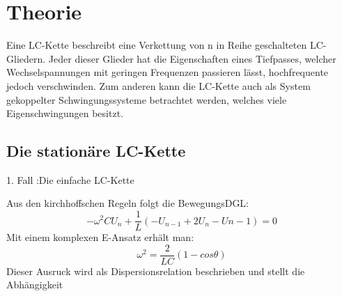 
\section{Theorie}
\label{sec:Theorie}

Eine LC-Kette beschreibt eine Verkettung von n in Reihe geschalteten LC-Gliedern. Jeder dieser Glieder hat die
 Eigenschaften eines Tiefpasses, welcher Wechselspannungen mit geringen Frequenzen passieren lässt, hochfrequente jedoch verschwinden. Zum anderen kann die LC-Kette auch als System gekoppelter Schwingungssysteme betrachtet werden, welches viele Eigenschwingungen besitzt.


\subsection{Die stationäre LC-Kette}
1. Fall :Die einfache LC-Kette

Aus den kirchhoffschen Regeln folgt die BewegungsDGL:
\begin{equation}
- \omega ^2 C U_n + \frac{1}{L} \left( -U_{n-1} + 2U_ n -U{n-1} \right) = 0
\end{equation}
Mit einem komplexen E-Ansatz erhält man:
\begin{equation}
\omega ^2 = \frac{2}{LC}(1-cos\theta)
\end{equation} 
Dieser Ausruck wird als Dispersionsrelation beschrieben und stellt die Abhängigkeit
